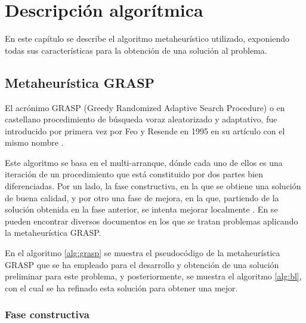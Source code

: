 
\chapter{Descripción algorítmica} %

\label{Chapter3}

En este capítulo se describe el algoritmo metaheurístico utilizado, exponiendo todas sus características para la obtención de una solución al problema.

\section{Metaheurística GRASP}
\label{sec_metaGrasp}
El acrónimo \gls{GRASP} (Greedy Randomized Adaptive Search Procedure) o en castellano procedimiento de búsqueda voraz aleatorizado y adaptativo, fue introducido por primera vez por Feo y Resende en 1995 en su artículo con el mismo nombre \cite{grasp-feo-resende}.

Este algoritmo se basa en el multi-arranque, dónde cada uno de ellos es una iteración de un procedimiento que está constituido por dos partes bien diferenciadas. Por un lado, la fase constructiva, en la que se obtiene una solución de buena calidad, y por otro una fase de mejora, en la que, partiendo de la solución obtenida en la fase anterior, se intenta mejorar localmente \cite{libro-metaheuristicas}. 
En \cite{grasp-flightrecoveryproblem} \cite{grasp-parallel} \cite{grasp-weapon} \cite{grasp-empaquetado} \cite{grasp-ruta} \cite{grasp-vertex} se pueden encontrar diversos documentos en los que se tratan problemas aplicando la metaheurística \gls{GRASP}.

En el algoritmo \ref{alg:grasp} se muestra el pseudocódigo de la metaheurística \gls{GRASP} que se ha empleado para el desarrollo y obtención de una solución preliminar para este problema, y posteriormente, se muestra el algoritmo \ref{alg:bl}, con el cual se ha refinado esta solución para obtener una mejor.\\

\subsection{Fase constructiva}
\label{sec:faseConstructiva}

